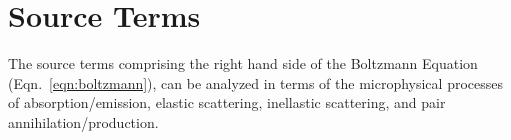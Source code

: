 \documentclass[aps,prd,twocolumn,superscriptaddress,groupedaddress]{revtex4}
\begin{document}
\appendix

\section{Source Terms}
\label{sec:source_terms}
The source terms comprising the right hand side of the Boltzmann Equation
(Eqn.~\ref{eqn:boltzmann}), can be analyzed in terms of the microphysical
processes of absorption/emission, elastic scattering, inellastic scattering,
and pair annihilation/production.


\end{document}
